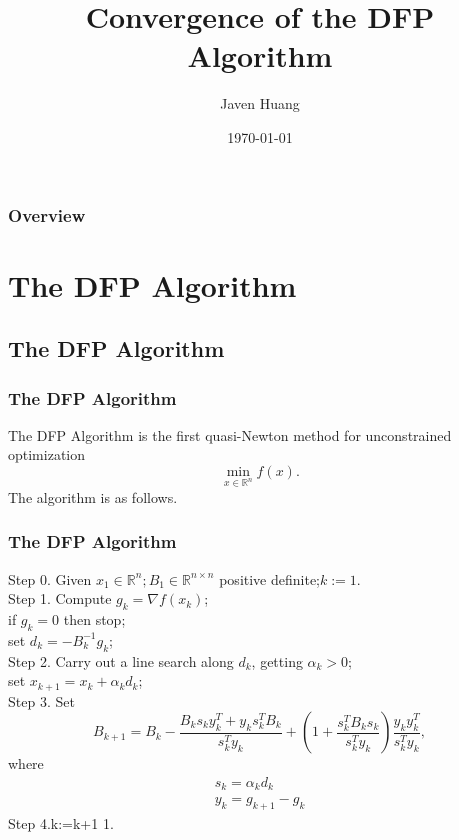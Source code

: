 \documentclass{beamer}
\title[Short title]{Convergence of the DFP Algorithm} %
\author{Javen Huang} %
\institute[sysu] %
{
Sun Yat-sen University \\ %
\medskip
\textit{huangjw267@mail2.sysu.edu.cn} %
}
\date{\today} %
\begin{document}
\begin{frame}
\titlepage %
\end{frame}

\begin{frame}
\frametitle{Overview} %
\tableofcontents %
\end{frame}


\section{The DFP Algorithm} 
\subsection{The DFP Algorithm}
\begin{frame}
\frametitle{The DFP Algorithm}
    The DFP Algorithm is the first quasi-Newton method for unconstrained optimization \[\min _{x \in \mathbb{R}^{n}} f(x) . \tag{1.1}\]
    The algorithm is as follows.
\end{frame}

\begin{frame}
\frametitle{The DFP Algorithm}
Step 0. Given $x_1 \in \mathbb{R}^n ; B_1 \in \mathbb{R}^{n \times n}$ positive definite;$k:=1.$\\
Step 1. Compute $g_k=\nabla f\left(x_k\right)$;\\
if $g_k=0$ then stop;\\
set $d_k=-B_k^{-1} g_k$;\\
Step 2. Carry out a line search along $d_k$, getting $\alpha_k>0$;\\
set $x_{k+1}=x_k+\alpha_k d_k$;\\
Step 3. Set\begin{equation*}
    B_{k+1}=B_k-\frac{B_k s_k y_k^T+y_k s_k^T B_k}{s_k^T y_k}+\left(1+\frac{s_k^T B_k s_k}{s_k^T y_k}\right) \frac{y_k y_k^T}{s_k^T y_k}, \tag{1.2}
\end{equation*}
where\begin{align*}
    s_k=\alpha_k d_k \tag{1.3}\\
    y_k=g_{k+1}-g_k  \tag{1.4}
\end{align*}
Step 4.k:=k+1  1.

\end{frame}
\end{document}

